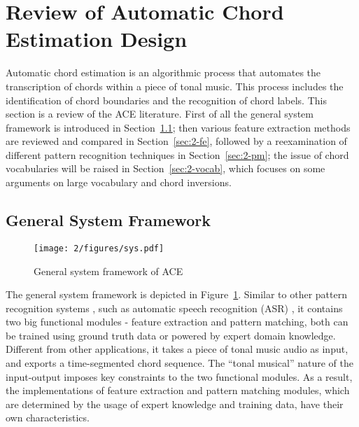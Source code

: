 \section{Review of Automatic Chord Estimation Design} \label{sec:2-review}
Automatic chord estimation is an algorithmic process that automates the transcription of chords within a piece of tonal music. This process includes the identification of chord boundaries and the recognition of chord labels. This section is a review of the ACE literature. First of all the general system framework is introduced in Section~\ref{sec:2-sys}; then various feature extraction methods are reviewed and compared in Section~\ref{sec:2-fe}, followed by a reexamination of different pattern recognition techniques in Section~\ref{sec:2-pm}; the issue of chord vocabularies will be raised in Section~\ref{sec:2-vocab}, which focuses on some arguments on large vocabulary and chord inversions.


\subsection{General System Framework} \label{sec:2-sys}

\begin{figure}[htb]
\centering
\texttt{[image: 2/figures/sys.pdf]}
\caption{General system framework of ACE}
\label{fig:2-sys}
\end{figure}

The general system framework is depicted in Figure~\ref{fig:2-sys}. Similar to other pattern recognition systems \cite{duda2012pattern}, such as automatic speech recognition (ASR) \cite{huang2001spoken}, it contains two big functional modules - feature extraction and pattern matching, both can be trained using ground truth data or powered by expert domain knowledge. Different from other applications, it takes a piece of tonal music audio as input, and exports a time-segmented chord sequence. The ``tonal musical'' nature of the input-output imposes key constraints to the two functional modules. As a result, the implementations of feature extraction and pattern matching modules, which are determined by the usage of expert knowledge and training data, have their own characteristics.

